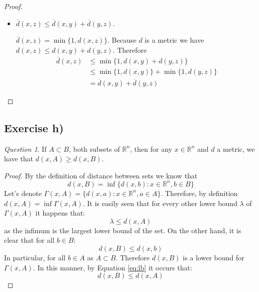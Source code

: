 \documentclass[11pt]{article}
\theoremstyle{definition}
\theoremstyle{remark}
\theoremstyle{remark}
\theoremstyle{remark}
\newtheorem*{question}{Question}
\newcommand{\R}{{\mathbb{R}}}
\begin{document}
\begin{proof}
\begin{itemize}
    \item $\overline{d}(x,z) \leq \overline{d}(x,y) + \overline{d}(y,z)$.

      $\overline{d}(x,z) = \min{\{1,d(x,z)\}}$. Because $d$ is a metric we have
      $d(x,z) \leq d(x,y) + d(y,z)$. Therefore
    \begin{align*}
      \overline{d}(x,z) &\leq \min{\{1,d(x,y) + d(y,z)\}} \\
                        &\leq \min{\{1,d(x,y)\}} + \min{\{1,d(y,z)\}} \\
                        &= \overline{d}(x,y) + \overline{d}(y,z)
    \end{align*}
\end{itemize}
\end{proof}

\subsection*{Exercise h)}
\begin{question}
  If $A \subset B$, both subsets of $\mathbb{R}^{n}$, then for any
  $x \in \mathbb{R}^{n}$ and $d$ a metric, we have that $d(x,A) \geq d(x,B)$.
\end{question}

\begin{proof}
  By the definition of distance between sets we know that
  \[d(x,B) = \inf \{ d(x,b) : x \in \mathbb{R}^{n}, b \in B \} \]
  Let's denote $\Gamma(x, A) = \{d(x,a) : x \in \R^{n}, a \in A\}$. Therefore,
  by definition $d(x, A) = \inf \Gamma(x, A)$. It is easily seen that for every
  other lower bound $\lambda$ of $\Gamma(x, A)$ it happens that:
  \begin{equation}
    \label{eq:lb}
    \lambda \le d(x, A)
  \end{equation}
  as the infimum is the largest lower bound of the set. On the other hand, it is
  clear that for all $b \in B$:
  \begin{equation*}
    d(x, B) \le d(x, b)
  \end{equation*}
  In particular, for all $b \in A$ as $A \subset B$. Therefore $d(x, B)$ is a
  lower bound for $\Gamma(x, A)$. In this manner, by Equation \ref{eq:lb} it
  occurs that:
  \begin{equation*}
    d(x, B) \le d(x, A)
  \end{equation*}
\end{proof}

\end{document}
